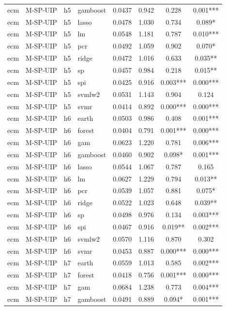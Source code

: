 \begin{ThreePartTable}
\begin{longtable}[t]{llclcccc}
ecm & M-SP-UIP & h5 & gamboost & 0.0437 & 0.942 & 0.228 & 0.001***\\
ecm & M-SP-UIP & h5 & lasso & 0.0478 & 1.030 & 0.734 & 0.089*\\
ecm & M-SP-UIP & h5 & lm & 0.0548 & 1.181 & 0.787 & 0.010***\\
ecm & M-SP-UIP & h5 & pcr & 0.0492 & 1.059 & 0.902 & 0.070*\\
ecm & M-SP-UIP & h5 & ridge & 0.0472 & 1.016 & 0.633 & 0.035**\\
ecm & M-SP-UIP & h5 & sp & 0.0457 & 0.984 & 0.218 & 0.015**\\
ecm & M-SP-UIP & h5 & spi & 0.0425 & 0.916 & 0.003*** & 0.000***\\
ecm & M-SP-UIP & h5 & svmlw2 & 0.0531 & 1.143 & 0.904 & 0.124\\
ecm & M-SP-UIP & h5 & svmr & 0.0414 & 0.892 & 0.000*** & 0.000***\\
\addlinespace
ecm & M-SP-UIP & h6 & earth & 0.0503 & 0.986 & 0.408 & 0.001***\\
ecm & M-SP-UIP & h6 & forest & 0.0404 & 0.791 & 0.001*** & 0.000***\\
ecm & M-SP-UIP & h6 & gam & 0.0623 & 1.220 & 0.781 & 0.006***\\
ecm & M-SP-UIP & h6 & gamboost & 0.0460 & 0.902 & 0.098* & 0.001***\\
ecm & M-SP-UIP & h6 & lasso & 0.0544 & 1.067 & 0.787 & 0.165\\
ecm & M-SP-UIP & h6 & lm & 0.0627 & 1.229 & 0.794 & 0.013**\\
ecm & M-SP-UIP & h6 & pcr & 0.0539 & 1.057 & 0.881 & 0.075*\\
ecm & M-SP-UIP & h6 & ridge & 0.0522 & 1.023 & 0.648 & 0.039**\\
ecm & M-SP-UIP & h6 & sp & 0.0498 & 0.976 & 0.134 & 0.003***\\
ecm & M-SP-UIP & h6 & spi & 0.0467 & 0.916 & 0.019** & 0.002***\\
ecm & M-SP-UIP & h6 & svmlw2 & 0.0570 & 1.116 & 0.870 & 0.302\\
ecm & M-SP-UIP & h6 & svmr & 0.0453 & 0.887 & 0.000*** & 0.000***\\
\addlinespace
ecm & M-SP-UIP & h7 & earth & 0.0559 & 1.013 & 0.585 & 0.002***\\
ecm & M-SP-UIP & h7 & forest & 0.0418 & 0.756 & 0.001*** & 0.000***\\
ecm & M-SP-UIP & h7 & gam & 0.0684 & 1.238 & 0.773 & 0.004***\\
ecm & M-SP-UIP & h7 & gamboost & 0.0491 & 0.889 & 0.094* & 0.001***\\

\end{longtable}
\end{ThreePartTable}
